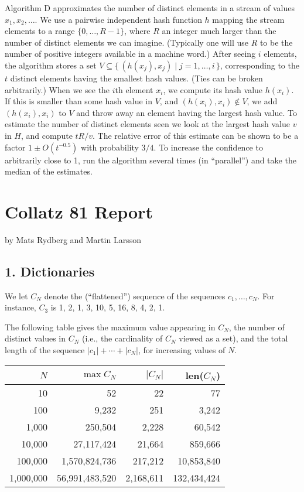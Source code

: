 \documentclass{tufte-handout}
\begin{document}
Algorithm D approximates the number of distinct elements in a stream
of values $x_1,x_2,\ldots$.
We use a pairwise independent hash function $h$ mapping the stream
elements to a range $\{0,\ldots, R-1\}$, where $R$ an integer much
larger than the number of distinct elements we can imagine.
(Typically one will use $R$ to be the number of positive integers
available in a machine word.)
After seeing $i$ elements, the algorithm stores a set $V\subseteq \{
\,(h(x_j),x_j) \mid j=1,\dots,i\,\}$, corresponding to the $t$ distinct
elements having the smallest hash values.
(Ties can be broken arbitrarily.)
When we see the $i$th element $x_i$, we compute its hash value
$h(x_i)$.
If this is smaller than some hash value in $V$, and
$(h(x_i),x_i)\not\in V$, we add $(h(x_i),x_i)$ to $V$ and throw away
an element having the largest hash value.
To estimate the number of distinct elements seen we look at the
largest hash value $v$ in $H$, and compute $tR/v$.
The relative error of this estimate can be shown to be a factor $1\pm
O(t^{-0.5})$ with probability $3/4$.
To increase the confidence to arbitrarily close to 1, run the
algorithm several times (in ``parallel'') and take the median of the
estimates.





\newpage
\section{Collatz 81 Report}


by Mats Rydberg and Martin Larsson


\subsection{1. Dictionaries}

We let $C_N$ denote the (``flattened'') sequence of the sequences
$c_1,\ldots, c_N$. For instance, $C_3$ is 1, 2, 1, 3, 10, 5, 16, 8, 4,
2, 1.


The following table gives the maximum value appearing in $C_N$, the number
of distinct values in $C_N$ (i.e., the cardinality of $C_N$ viewed as
a set), and the total length of the sequence $|c_1|+\cdots+|c_N|$,
for increasing values of $N$.

\medskip
\begin{tabular}{rrrr}
  \toprule
  $N$ & $\max C_N$ & $|C_N|$ & len($C_N$) \\
  \midrule
  10 & 52 & 22 & 77 
  \\
  100 & 9,232 & 251 & 3,242 \\
  1,000 & 250,504 & 2,228 & 60,542 \\
  10,000 & 27,117,424 & 21,664 & 859,666 \\
  100,000 & 1,570,824,736 & 217,212 & 10,853,840\\
  1,000,000 & 56,991,483,520 & 2,168,611 & 132,434,424\\
  \bottomrule
\end{tabular}
\end{document}
